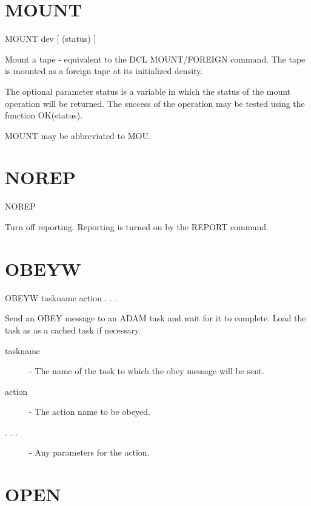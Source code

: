\documentclass[twoside,11pt]{report}
\newcommand{\xlabel}[1]{}
\begin{document}
\section{\xlabel{MOUNT}MOUNT\label{MOUNT}}

    MOUNT \hspace{.5cm} dev \hspace{.5cm} [ (status) ]

 Mount a tape - equivalent to the DCL MOUNT/FOREIGN command. The tape
 is mounted as a foreign tape at its initialized density.

 The optional parameter status is a variable in which the status of
 the mount operation will be returned. The success of the operation
 may be tested using the function OK(status).

 MOUNT may be abbreviated to MOU.

\section{\xlabel{NOREP}NOREP\label{NOREP}}

   NOREP

Turn off reporting. Reporting is turned on by the REPORT command.



\section{\xlabel{OBEYW}OBEYW\label{OBEYW}}

    OBEYW \hspace{.5cm} taskname \hspace{.5cm} action  . . .

 Send an OBEY message to an ADAM task and wait for it to complete. Load the
 task as as a cached task if necessary.

\begin{description}

 \item[taskname] - The name of the task to which the obey message will be sent.

 \item[action] - The action name to be obeyed.

 \item[. . .] - Any parameters for the action.

\end{description}

\section{\xlabel{OPEN}OPEN\label{OPEN}}
\end{document}
